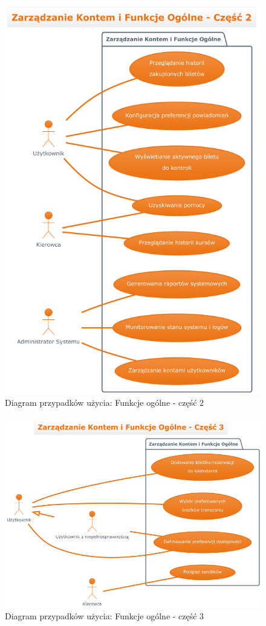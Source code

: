 \documentclass[a4paper,12pt]{article}
\begin{document}
\begin{figure}[H]
    \centering
    \includegraphics[width=0.8\linewidth]{diagramy/przypadki_uzycia/images/diagram_zarzadzanie_kontem_2.png}
    \caption{Diagram przypadków użycia: Funkcje ogólne - część 2}
    \label{fig:diag_zk_2}
\end{figure}
\begin{figure}[H]
    \centering
    \includegraphics[width=0.8\linewidth]{diagramy/przypadki_uzycia/images/diagram_zarzadzanie_kontem_3.png}
    \caption{Diagram przypadków użycia: Funkcje ogólne - część 3}
    \label{fig:diag_zk_3}
\end{figure}
\end{document}
